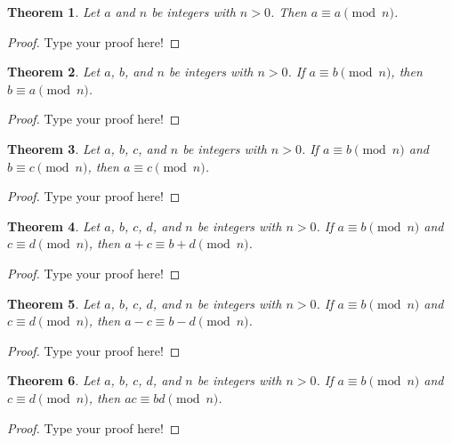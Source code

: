 \documentclass[12pt,leqno]{article}
\numberwithin{equation}{section}
\newtheorem{thm}{Theorem}[section]
\theoremstyle{definition}
\begin{document}
\begin{thm}
Let $a$ and $n$ be integers with $n > 0$. Then $a \equiv a
\pmod{n}$.
\end{thm}

\begin{proof}[Proof]
Type your proof here!
\end{proof}

\begin{thm}
Let $a$, $b$, and $n$ be integers with $n > 0$. If $a \equiv b
\pmod{n}$, then ${b \equiv a \pmod{n}}$.
\end{thm}

\begin{proof}[Proof]
Type your proof here!
\end{proof}

\begin{thm}
Let $a$, $b$, $c$, and $n$ be integers with $n > 0$. If $a \equiv b
\pmod{n}$ and ${b \equiv c \pmod{n}}$, then $a \equiv c \pmod{n}$.
\end{thm}

\begin{proof}[Proof]
Type your proof here!
\end{proof}

\begin{thm}
Let $a$, $b$, $c$, $d$, and $n$ be integers with $n > 0$. If $a
\equiv b \pmod{n}$ and~${c \equiv d \pmod{n}}$, then $a + c \equiv b
+ d \pmod{n}$.
\end{thm}

\begin{proof}[Proof]
Type your proof here!
\end{proof}

\begin{thm}
Let $a$, $b$, $c$, $d$, and $n$ be integers with $n > 0$. If $a
\equiv b \pmod{n}$ and~${c \equiv d \pmod{n}}$, then $a - c \equiv b
- d \pmod{n}$.
\end{thm}

\begin{proof}[Proof]
Type your proof here!
\end{proof}

\begin{thm}
Let $a$, $b$, $c$, $d$, and $n$ be integers
with $n > 0$. If $a \equiv b \pmod{n}$ and~${c \equiv d \pmod{n}}$, then
$ac \equiv bd \pmod{n}$.
\end{thm}

\begin{proof}[Proof]
Type your proof here!
\end{proof}
\end{document}
